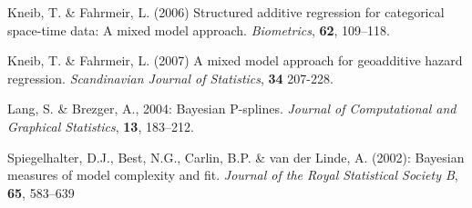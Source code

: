 \documentclass[11pt,a4paper,twoside]{bayesxreport}
\begin{document}
\begin{thebibliography}{99}
  {Kneib, T. \& Fahrmeir, L.} (2006) Structured additive
 regression for categorical space-time data: A mixed model approach. {\it Biometrics}, {\bf 62}, 109--118.

  {Kneib, T. \& Fahrmeir, L.} (2007) A mixed model approach for
 geoadditive hazard regression. {\it Scandinavian Journal of Statistics}, {\bf 34} 207-228.

 Lang, S. \& Brezger, A., 2004: Bayesian P-splines. {\it Journal of Computational
and Graphical Statistics}, {\bf 13}, 183--212.

 Spiegelhalter, D.J., Best, N.G., Carlin, B.P. \& van der Linde, A. (2002):
Bayesian measures of model complexity and fit. {\it Journal of the Royal Statistical Society B}, {\bf 65}, 583--639

\end{thebibliography}
\end{document}
